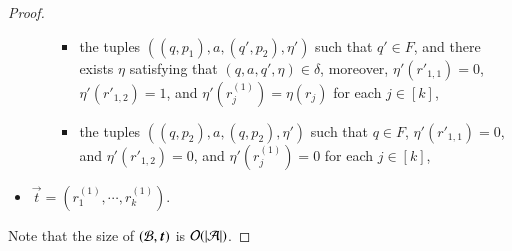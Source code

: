 \begin{proof}
\begin{itemize}
\begin{itemize}
\begin{itemize}
				\item the tuples $((q, p_1), a, (q', p_2), \eta')$ such that $q' \in F$, and there exists $\eta$ satisfying that $(q, a, q', \eta) \in \delta$, moreover, $\eta'(r'_{1,1}) = 0$, $\eta'(r'_{1,2}) = 1$, and $\eta'(r^{(1)}_j)=\eta(r_j)$ for each $j \in [k]$,
				\item the tuples $((q, p_2), a, (q, p_2), \eta')$ such that $q \in F$, $\eta'(r'_{1,1}) = 0$, and $\eta'(r'_{1,2}) = 0$, and $\eta'(r^{(1)}_j)=0$ for each $j \in [k]$,
			\end{itemize}
		\end{itemize}
		\item $\vec{t}=(r^{(1)}_1, \cdots, r^{(1)}_k)$.
	\end{itemize}
	Note that the size of $(\cB, \vec{t})$ is $\mathcal{O}(|\mathcal{A}|)$.

\end{proof}
